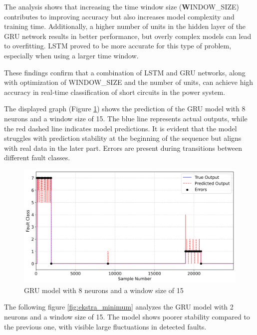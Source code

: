\documentclass[11pt]{IEEEtran}
\begin{document}
The analysis shows that increasing the time window size (\textbf{W}INDOW\_SIZE) contributes to improving accuracy but also increases model complexity and training time. Additionally, a higher number of units in the hidden layer of the GRU network results in better performance, but overly complex models can lead to overfitting. LSTM proved to be more accurate for this type of problem, especially when using a larger time window.

These findings confirm that a combination of LSTM and GRU networks, along with optimization of WINDOW\_SIZE and the number of units, can achieve high accuracy in real-time classification of short circuits in the power system.

The displayed graph (Figure \ref{2}) shows the prediction of the GRU model with 8 neurons and a window size of 15. The blue line represents actual outputs, while the red dashed line indicates model predictions. It is evident that the model struggles with prediction stability at the beginning of the sequence but aligns with real data in the later part. Errors are present during transitions between different fault classes.

\begin{figure}[H]
    \centering
    \includegraphics[width=1\linewidth]{figs/true_vs_predicted_gru_minimum_model_window_size_15.png}
    \caption{GRU model with 8 neurons and a window size of 15}
    \label{2}
\end{figure}
The following figure \ref{fig:ekstra_minimum} analyzes the GRU model with 2 neurons and a window size of 15. The model shows poorer stability compared to the previous one, with visible large fluctuations in detected faults.
\end{document}
